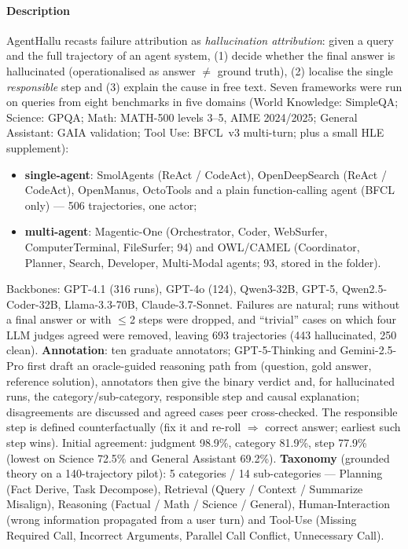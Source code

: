 \paragraph{Description} AgentHallu recasts failure attribution as \emph{hallucination attribution}: given a query and the full trajectory of an agent system, (1) decide whether the final answer is hallucinated (operationalised as answer $\neq$ ground truth), (2) localise the single \emph{responsible} step and (3) explain the cause in free text. Seven frameworks were run on queries from eight benchmarks in five domains (World Knowledge: SimpleQA; Science: GPQA; Math: MATH-500 levels 3--5, AIME 2024/2025; General Assistant: GAIA validation; Tool Use: BFCL~v3 multi-turn; plus a small HLE supplement):
\begin{itemize}
\item \textbf{single-agent}: SmolAgents (ReAct / CodeAct), OpenDeepSearch (ReAct / CodeAct), OpenManus, OctoTools and a plain function-calling agent (BFCL only) --- 506 trajectories, one actor;
\item \textbf{multi-agent}: Magentic-One (Orchestrator, Coder, WebSurfer, ComputerTerminal, FileSurfer; 94) and OWL/CAMEL (Coordinator, Planner, Search, Developer, Multi-Modal agents; 93, stored in the  folder).
\end{itemize}
Backbones: GPT-4.1 (316 runs), GPT-4o (124), Qwen3-32B, GPT-5, Qwen2.5-Coder-32B, Llama-3.3-70B, Claude-3.7-Sonnet. Failures are natural; runs without a final answer or with $\le$2 steps were dropped, and ``trivial'' cases on which four LLM judges agreed were removed, leaving 693 trajectories (443 hallucinated, 250 clean). \textbf{Annotation}: ten graduate annotators; GPT-5-Thinking and Gemini-2.5-Pro first draft an oracle-guided reasoning path from (question, gold answer, reference solution), annotators then give the binary verdict and, for hallucinated runs, the category/sub-category, responsible step and causal explanation; disagreements are discussed and agreed cases peer cross-checked. The responsible step is defined counterfactually (fix it and re-roll $\Rightarrow$ correct answer; earliest such step wins). Initial agreement: judgment 98.9\%, category 81.9\%, step 77.9\% (lowest on Science 72.5\% and General Assistant 69.2\%). \textbf{Taxonomy} (grounded theory on a 140-trajectory pilot): 5 categories / 14 sub-categories --- Planning (Fact Derive, Task Decompose), Retrieval (Query / Context / Summarize Misalign), Reasoning (Factual / Math / Science / General), Human-Interaction (wrong information propagated from a user turn) and Tool-Use (Missing Required Call, Incorrect Arguments, Parallel Call Conflict, Unnecessary Call).

